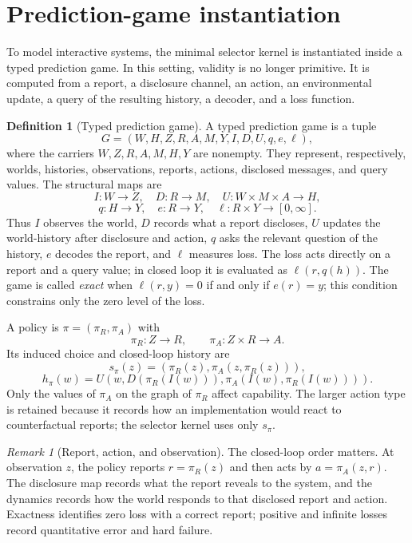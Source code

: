 \documentclass[11pt]{article}
\theoremstyle{plain}
\theoremstyle{definition}
\newtheorem{definition}[theorem]{Definition}
\theoremstyle{remark}
\newtheorem{remark}[theorem]{Remark}
\begin{document}
\section{Prediction-game instantiation}\label{sec:games}

To model interactive systems, the minimal selector kernel is instantiated inside
a typed prediction game. In this setting, validity is no longer primitive. It is
computed from a report, a disclosure channel, an action, an environmental update,
a query of the resulting history, a decoder, and a loss function.

\begin{definition}[Typed prediction game]\label{def:game}
A typed prediction game is a tuple
\[
G=(W,H,Z,R,A,M,Y,I,D,U,q,e,\ell),
\]
where the carriers $W,Z,R,A,M,H,Y$ are nonempty. They represent, respectively,
worlds, histories, observations, reports, actions, disclosed messages, and query
values. The structural maps are
\[
I:W\to Z,\quad D:R\to M,\quad U:W\times M\times A\to H,
\]
\[
q:H\to Y,\quad e:R\to Y,\quad \ell:R\times Y\to[0,\infty].
\]
Thus $I$ observes the world, $D$ records what a report discloses, $U$ updates the
world-history after disclosure and action, $q$ asks the relevant question of the
history, $e$ decodes the report, and $\ell$ measures loss. The loss acts directly
on a report and a query value; in closed loop it is evaluated as $\ell(r,q(h))$.
The game is called \emph{exact} when $\ell(r,y)=0$ if and only if $e(r)=y$; this
condition constrains only the zero level of the loss.

A policy is $\pi=(\pi_R,\pi_A)$ with
\[
\pi_R:Z\to R,\qquad \pi_A:Z\times R\to A.
\]
Its induced choice and closed-loop history are
\[
s_\pi(z)=(\pi_R(z),\pi_A(z,\pi_R(z))),
\]
\[
h_\pi(w)=U(w,D(\pi_R(I(w))),\pi_A(I(w),\pi_R(I(w)))).
\]
Only the values of $\pi_A$ on the graph of $\pi_R$ affect capability. The larger
action type is retained because it records how an implementation would react to
counterfactual reports; the selector kernel uses only $s_\pi$.
\end{definition}

\begin{remark}[Report, action, and observation]
The closed-loop order matters. At observation $z$, the policy reports
$r=\pi_R(z)$ and then acts by $a=\pi_A(z,r)$. The disclosure map records what the
report reveals to the system, and the dynamics records how the world responds to
that disclosed report and action. Exactness identifies zero loss with a correct
report; positive and infinite losses record quantitative error and hard failure.
\end{remark}
\end{document}
